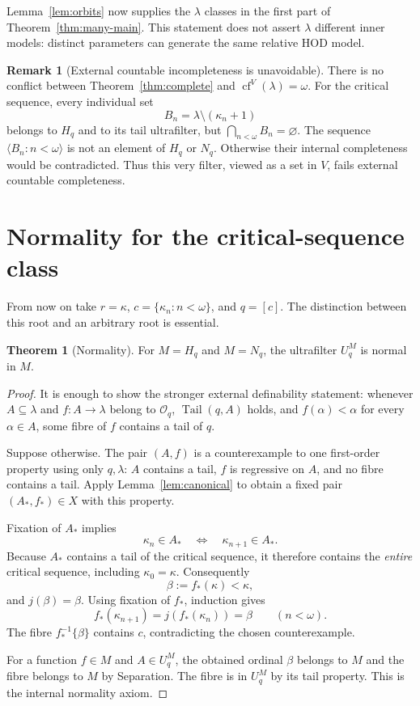 \documentclass[11pt,letterpaper]{article}
\theoremstyle{definition}
\newtheorem{theorem}[definition]{Theorem}
\newtheorem{remark}[definition]{Remark}
\numberwithin{equation}{section}
\newcommand{\cf}{\operatorname{cf}}
\newcommand{\Tail}{\operatorname{Tail}}
\begin{document}
Lemma~\ref{lem:orbits} now supplies the $\lambda$ classes in the first part of Theorem~\ref{thm:many-main}. This statement does not assert $\lambda$ different inner models: distinct parameters can generate the same relative HOD model.

\begin{remark}[External countable incompleteness is unavoidable]\label{rem:external}
There is no conflict between Theorem~\ref{thm:complete} and $\cf^V(\lambda)=\omega$. For the critical sequence, every individual set
\[
 B_n=\lambda\setminus(\kappa_n+1)
\]
belongs to $H_q$ and to its tail ultrafilter, but $\bigcap_{n<\omega}B_n=\varnothing$. The sequence $\langle B_n:n<\omega\rangle$ is not an element of $H_q$ or $N_q$. Otherwise their internal completeness would be contradicted. Thus this very filter, viewed as a set in $V$, fails external countable completeness.
\end{remark}

\section{Normality for the critical-sequence class}\label{sec:normal}

From now on take $r=\kappa$, $c=\{\kappa_n:n<\omega\}$, and $q=[c]$. The distinction between this root and an arbitrary root is essential.

\begin{theorem}[Normality]\label{thm:normal}
For $M=H_q$ and $M=N_q$, the ultrafilter $U_q^M$ is normal in $M$.
\end{theorem}

\begin{proof}
It is enough to show the stronger external definability statement: whenever $A\subseteq\lambda$ and $f:A\to\lambda$ belong to $\mathcal O_q$, $\Tail(q,A)$ holds, and $f(\alpha)<\alpha$ for every $\alpha\in A$, some fibre of $f$ contains a tail of $q$.

Suppose otherwise. The pair $(A,f)$ is a counterexample to one first-order property using only $q,\lambda$: $A$ contains a tail, $f$ is regressive on $A$, and no fibre contains a tail. Apply Lemma~\ref{lem:canonical} to obtain a fixed pair $(A_*,f_*)\in X$ with this property.

Fixation of $A_*$ implies
\[
 \kappa_n\in A_*\quad\Longleftrightarrow\quad\kappa_{n+1}\in A_*.
\]
Because $A_*$ contains a tail of the critical sequence, it therefore contains the \emph{entire} critical sequence, including $\kappa_0=\kappa$. Consequently
\[
 \beta:=f_*(\kappa)<\kappa,
\]
and $j(\beta)=\beta$. Using fixation of $f_*$, induction gives
\[
 f_*(\kappa_{n+1})=j(f_*(\kappa_n))=\beta
 \qquad(n<\omega).
\]
The fibre $f_*^{-1}\{\beta\}$ contains $c$, contradicting the chosen counterexample.

For a function $f\in M$ and $A\in U_q^M$, the obtained ordinal $\beta$ belongs to $M$ and the fibre belongs to $M$ by Separation. The fibre is in $U_q^M$ by its tail property. This is the internal normality axiom.
\end{proof}
\end{document}
